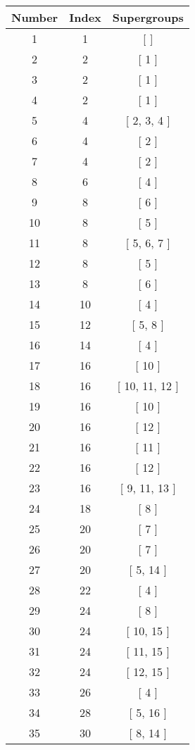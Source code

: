 \begin{center}
\begin{longtable}[H]{|| c c c ||}
\hline
Number & Index & Supergroups \\ 
\hline
1 & 1 & [  ] \\ 
\hline
2 & 2 & [ 1 ] \\ 
\hline
3 & 2 & [ 1 ] \\ 
\hline
4 & 2 & [ 1 ] \\ 
\hline
5 & 4 & [ 2, 3, 4 ] \\ 
\hline
6 & 4 & [ 2 ] \\ 
\hline
7 & 4 & [ 2 ] \\ 
\hline
8 & 6 & [ 4 ] \\ 
\hline
9 & 8 & [ 6 ] \\ 
\hline
10 & 8 & [ 5 ] \\ 
\hline
11 & 8 & [ 5, 6, 7 ] \\ 
\hline
12 & 8 & [ 5 ] \\ 
\hline
13 & 8 & [ 6 ] \\ 
\hline
14 & 10 & [ 4 ] \\ 
\hline
15 & 12 & [ 5, 8 ] \\ 
\hline
16 & 14 & [ 4 ] \\ 
\hline
17 & 16 & [ 10 ] \\ 
\hline
18 & 16 & [ 10, 11, 12 ] \\ 
\hline
19 & 16 & [ 10 ] \\ 
\hline
20 & 16 & [ 12 ] \\ 
\hline
21 & 16 & [ 11 ] \\ 
\hline
22 & 16 & [ 12 ] \\ 
\hline
23 & 16 & [ 9, 11, 13 ] \\ 
\hline
24 & 18 & [ 8 ] \\ 
\hline
25 & 20 & [ 7 ] \\ 
\hline
26 & 20 & [ 7 ] \\ 
\hline
27 & 20 & [ 5, 14 ] \\ 
\hline
28 & 22 & [ 4 ] \\ 
\hline
29 & 24 & [ 8 ] \\ 
\hline
30 & 24 & [ 10, 15 ] \\ 
\hline
31 & 24 & [ 11, 15 ] \\ 
\hline
32 & 24 & [ 12, 15 ] \\ 
\hline
33 & 26 & [ 4 ] \\ 
\hline
34 & 28 & [ 5, 16 ] \\ 
\hline
35 & 30 & [ 8, 14 ] \\ 
\hline

\end{longtable}
\end{center}
